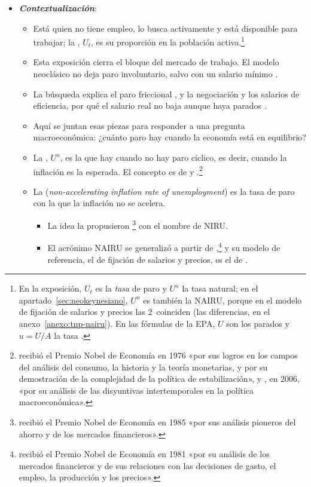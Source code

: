 \documentclass[11pt]{article}
\begin{document}
\begin{itemize}
\item \textbf{\emph{Contextualización}}:
  \begin{itemize}
  \item Está  quien no tiene empleo, lo busca activamente y está disponible para trabajar; la , $U_t$, es su proporción en la población activa\nocite{INE2026EPA3T}.\footnote{En la exposición, $U_t$ es la \emph{tasa} de paro y $U^n$ la tasa natural; en el apartado~\ref{sec:neokeynesiano}, $U^n$ es también la NAIRU, porque en el modelo de fijación de salarios y precios las 2~coinciden (las diferencias, en el anexo~\ref{anexo:tnp-nairu}). En las fórmulas de la EPA, $U$ son los parados y $u=U/A$ la tasa .}
  \item Esta exposición cierra el bloque del mercado de trabajo. El modelo neoclásico no deja paro involuntario, salvo con un salario mínimo .
  \item La búsqueda explica el paro friccional , y la negociación y los salarios de eficiencia, por qué el salario real no baja aunque haya parados .
  \item Aquí se juntan esas piezas para responder a una pregunta macroeconómica: ¿cuánto paro hay cuando la economía está en equilibrio?
  \item La , $U^n$, es la que hay cuando no hay paro cíclico, es decir, cuando la inflación es la esperada. El concepto es de \textcite{Phelps1967Phillips} y \textcite{Friedman1968Role}.\footnote{ recibió el Premio Nobel de Economía en 1976 «por sus logros en los campos del análisis del consumo, la historia y la teoría monetarias, y por su demostración de la complejidad de la política de estabilización»\nocite{Nobel1976Friedman}, y , en 2006, «por su análisis de las disyuntivas intertemporales en la política macroeconómica»\nocite{Nobel2006Phelps}.}
  \item La  (\emph{non-accelerating inflation rate of unemployment}) es la tasa de paro con la que la inflación no se acelera.
    \begin{itemize}
    \item La idea la propusieron \textcite{ModiglianiPapademos1975Targets}\footnote{ recibió el Premio Nobel de Economía en 1985 «por sus análisis pioneros del ahorro y de los mercados financieros»\nocite{Nobel1985Modigliani}.} con el nombre de NIRU.
    \item El acrónimo NAIRU se generalizó a partir de \textcite[24-25]{Tobin1980Stabilization},\footnote{ recibió el Premio Nobel de Economía en 1981 «por su análisis de los mercados financieros y de sus relaciones con las decisiones de gasto, el empleo, la producción y los precios»\nocite{Nobel1981Tobin}.} y su modelo de referencia, el de fijación de salarios y precios, es el de \textcite{LayardNickellJackman1991Unemployment}.
    \end{itemize}
  \end{itemize}


\end{itemize}
\end{document}
